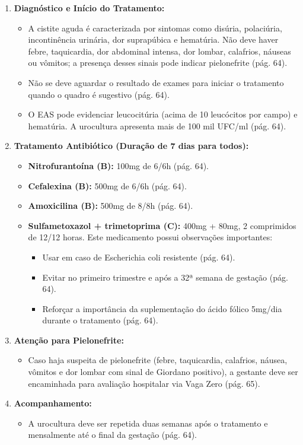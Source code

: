 \documentclass[conference,a4paper]{IEEEtran}
\begin{document}
\begin{enumerate}
  \item \textbf{Diagnóstico e Início do Tratamento:}
  \begin{itemize}
    \item A cistite aguda é caracterizada por sintomas como
          disúria, polaciúria, incontinência urinária, dor
          suprapúbica e hematúria. Não deve haver febre,
          taquicardia, dor abdominal intensa, dor lombar,
          calafrios, náuseas ou vômitos; a presença desses sinais
          pode indicar pielonefrite (pág. 64).
    \item Não se deve aguardar o resultado de exames para
          iniciar o tratamento quando o quadro é sugestivo
          (pág. 64).
    \item O EAS pode evidenciar leucocitúria (acima de 10
          leucócitos por campo) e hematúria. A urocultura
          apresenta mais de 100 mil UFC/ml (pág. 64).
  \end{itemize}
  \item \textbf{Tratamento Antibiótico (Duração de 7 dias para
        todos):}
  \begin{itemize}
    \item \textbf{Nitrofurantoína (B):} 100mg de 6/6h (pág. 64).
    \item \textbf{Cefalexina (B):} 500mg de 6/6h (pág. 64).
    \item \textbf{Amoxicilina (B):} 500mg de 8/8h (pág. 64).
    \item \textbf{Sulfametoxazol + trimetoprima (C):} 400mg +
          80mg, 2 comprimidos de 12/12 horas. Este medicamento
          possui observações importantes:
    \begin{itemize}
      \item Usar em caso de Escherichia coli resistente
            (pág. 64).
      \item Evitar no primeiro trimestre e após a 32ª semana de
            gestação (pág. 64).
      \item Reforçar a importância da suplementação do ácido
            fólico 5mg/dia durante o tratamento (pág. 64).
    \end{itemize}
  \end{itemize}
  \item \textbf{Atenção para Pielonefrite:}
  \begin{itemize}
    \item Caso haja suspeita de pielonefrite (febre, taquicardia,
          calafrios, náusea, vômitos e dor lombar com sinal de
          Giordano positivo), a gestante deve ser encaminhada
          para avaliação hospitalar via Vaga Zero (pág. 65).
  \end{itemize}
  \item \textbf{Acompanhamento:}
  \begin{itemize}
    \item A urocultura deve ser repetida duas semanas após o
          tratamento e mensalmente até o final da gestação
          (pág. 64).
  \end{itemize}
\end{enumerate}
\end{document}
